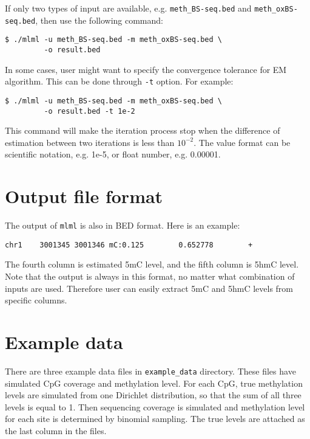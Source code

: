 \documentclass[11pt]{article}
\newcommand{\prog}[1]{\texttt{#1}}
\newcommand{\fn}[1]{\texttt{#1}}
\newcommand{\op}[1]{\texttt{#1}}
\begin{document}
If only two types of input are available, e.g. \fn{meth\_BS-seq.bed} and \fn{meth\_oxBS-seq.bed}, then use the following command:
\begin{verbatim}
$ ./mlml -u meth_BS-seq.bed -m meth_oxBS-seq.bed \
         -o result.bed
\end{verbatim}

In some cases, user might want to specify the convergence tolerance for EM algorithm. This can be done through \op{-t} option. For example:
\begin{verbatim}
$ ./mlml -u meth_BS-seq.bed -m meth_oxBS-seq.bed \
         -o result.bed -t 1e-2
\end{verbatim}
This command will make the iteration process stop when the difference of estimation between two iterations is less than $10^{-2}$. The value format can be scientific notation, e.g. 1e-5, or float number, e.g. 0.00001.

\section{Output file format}	
The output of \prog{mlml} is also in BED format. Here is an example:
\begin{verbatim}
chr1    3001345 3001346 mC:0.125        0.652778        +
\end{verbatim}
The fourth column is estimated 5mC level, and the fifth column is 5hmC level. Note that the output is always in this format, no matter what combination of inputs are used. Therefore user can easily extract 5mC and 5hmC levels from specific columns.

\section{Example data}
There are three example data files in \fn{example\_data} directory. These files have simulated CpG coverage and methylation level. For each CpG, true methylation levels are simulated from one Dirichlet distribution, so that the sum of all three levels is equal to 1. Then sequencing coverage is simulated and methylation level for each site is determined by binomial sampling. The true levels are attached as the last column in the files.
\end{document}
